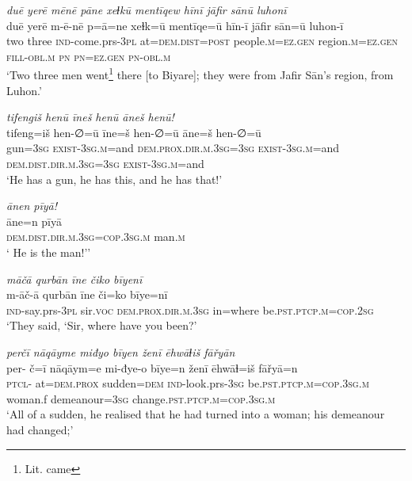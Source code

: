 \ea \label{ŠJ.9}
\textit{duē yerē mēnē pāne xeɫkū mentīqew hīnī jāfir sānū luhonī} \\ 
\gll duē yerē m-ē-nē p=ā=ne xeɫk=ū mentīqe=ū hīn-ī jāfir sān=ū luhon-ī \\ 
 two three \textsc{ind-}come.prs\textsc{-3pl} at=\textsc{dem.dist}\textsc{=\textsc{post}} people\textsc{.m}\textsc{=ez.gen} region\textsc{.m}\textsc{=ez.gen} \textsc{fill}\textsc{-obl}\textsc{.m} \textsc{pn} \textsc{pn}\textsc{=ez.gen} \textsc{pn}\textsc{-obl}\textsc{.m} \\ 
\glt `Two three men went\footnote{Lit. came} there [to Biyare]; they were from Jafir Sān’s region, from Luhon.'
\z 
 
\ea \label{ŠJ.12}
\textit{tifengiš henū īneš henū āneš henū!} \\ 
\gll tifeng=iš hen-∅=ū īne=š hen-∅=ū āne=š hen-∅=ū \\ 
 gun\textsc{=3sg} \textsc{exist}\textsc{-3sg}\textsc{.m}=and \textsc{dem.prox}\textsc{.dir}\textsc{.m}\textsc{.3sg}\textsc{=3sg} \textsc{exist}\textsc{-3sg}\textsc{.m}=and \textsc{dem.dist}\textsc{.dir}\textsc{.m}\textsc{.3sg}\textsc{=3sg} \textsc{exist-3sg.m}=and \\ 
\glt `He has a gun, he has this, and he has that!'
\z 
 
\ea \label{ŠJ.19}
\textit{ānen pīyā!} \\ 
\gll āne=n pīyā \\ 
 \textsc{dem.dist}\textsc{.dir}\textsc{.m}\textsc{.3sg}\textsc{=cop}\textsc{.3sg}\textsc{.m} man\textsc{.m} \\ 
\glt ` He is the man!’'
\z 
 
\ea \label{ŠJ.30}
\textit{māčā qurbān īne čiko bīyenī} \\ 
\gll m-āč-ā qurbān īne či=ko bīye=nī \\ 
 \textsc{ind-}say.prs\textsc{-3pl} sir.\textsc{voc} \textsc{dem.prox}\textsc{.dir}\textsc{.m}\textsc{.3sg} in=where be\textsc{.pst}\textsc{.ptcp}\textsc{.m}\textsc{=cop}\textsc{.\textsc{2sg}} \\ 
\glt `They said, ‘Sir, where have you been?'
\z 
 
\ea \label{ŠJ.48}
\textit{perčī nāqāyme miđyo bīyen ženī ēhwāɫiš fāřyān} \\ 
\gll per- č=ī nāqāym=e mi-đye-o bīye=n ženī ēhwāɫ=iš fāřyā=n \\ 
 \textsc{ptcl}- at=\textsc{dem.prox} sudden\textsc{=dem} \textsc{ind-}look.prs\textsc{-3sg} be\textsc{.pst}\textsc{.ptcp}\textsc{.m}\textsc{=cop}\textsc{.3sg}\textsc{.m} woman.f demeanour\textsc{=3sg} change\textsc{.pst}\textsc{.ptcp}\textsc{.m}\textsc{=cop}\textsc{.3sg}\textsc{.m} \\ 
\glt `All of a sudden, he realised that he had turned into a woman; his demeanour had changed;'
\z 
 
